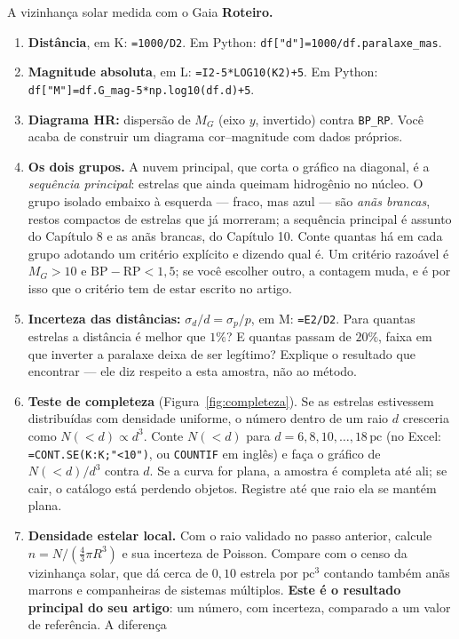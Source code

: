 \documentclass[11pt,a4paper]{article}
\begin{document}
\begin{lessonblock}[borderline west={2pt}{0pt}{astroBlue}]{A vizinhança solar medida com o Gaia}
\textbf{Roteiro.}
\begin{enumerate}
\item \textbf{Distância}, em K: \texttt{=1000/D2}. Em Python:
\texttt{df["d"]=1000/df.paralaxe\_mas}.
\item \textbf{Magnitude absoluta}, em L: \texttt{=I2-5*LOG10(K2)+5}. Em Python:
\texttt{df["M"]=df.G\_mag-5*np.log10(df.d)+5}.
\item \textbf{Diagrama HR:} dispersão de $M_G$ (eixo $y$, invertido) contra
\texttt{BP\_RP}. Você acaba de construir um diagrama cor--magnitude com dados próprios.
\item \textbf{Os dois grupos.} A nuvem principal, que corta o gráfico na diagonal, é a
\emph{sequência principal}: estrelas que ainda queimam hidrogênio no núcleo. O grupo
isolado embaixo à esquerda --- fraco, mas azul --- são \emph{anãs brancas}, restos
compactos de estrelas que já morreram; a sequência principal é assunto do Capítulo 8 e as anãs brancas, do Capítulo 10. Conte
quantas há em cada grupo adotando um critério explícito e dizendo qual é. Um critério
razoável é $M_G>10$ e $\mathrm{BP}-\mathrm{RP}<1{,}5$; se você escolher outro, a
contagem muda, e é por isso que o critério tem de estar escrito no artigo.
\item \textbf{Incerteza das distâncias:} $\sigma_d/d=\sigma_p/p$, em M:
\texttt{=E2/D2}. Para quantas estrelas a distância é melhor que $1\%$? E quantas passam de
$20\%$, faixa em que inverter a paralaxe deixa de ser legítimo? Explique o resultado que
encontrar --- ele diz respeito a esta amostra, não ao método.
\item \textbf{Teste de completeza} (Figura~\ref{fig:completeza}). Se as estrelas estivessem distribuídas com densidade
uniforme, o número dentro de um raio $d$ cresceria como $N(<d)\propto d^{3}$. Conte
$N(<d)$ para $d=6,8,10,\ldots,18\,\mathrm{pc}$ (no Excel:
\texttt{=CONT.SE(K:K;"<10")}, ou \texttt{COUNTIF} em inglês) e faça o gráfico de
$N(<d)/d^{3}$ contra $d$. Se a curva for plana, a amostra é completa até ali; se cair, o
catálogo está perdendo objetos. Registre até que raio ela se mantém plana.
\item \textbf{Densidade estelar local.} Com o raio validado no passo anterior, calcule
$n=N/(\tfrac{4}{3}\pi R^{3})$ e sua incerteza de Poisson. Compare com o censo da
vizinhança solar, que dá cerca de $0{,}10$ estrela por $\mathrm{pc^{3}}$ contando também
anãs marrons e companheiras de sistemas múltiplos. \textbf{Este é o resultado principal do
seu artigo}: um número, com incerteza, comparado a um valor de referência. A diferença

\end{enumerate}
\end{lessonblock}
\end{document}
